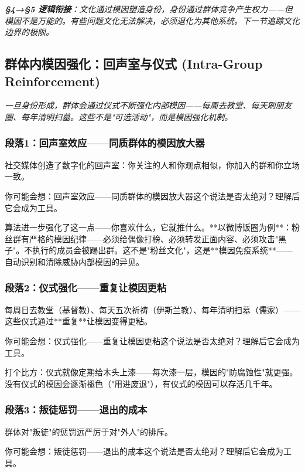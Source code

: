 \documentclass[a4paper,12pt]{book}
\newenvironment{motivation}{\begin{tcolorbox}[colback=gray!10,colframe=gray!60,title=\textit{本章动机 (Motivation)},fonttitle=\bfseries,arc=0mm,leftrule=3mm]\small\itshape}{\end{tcolorbox}}
\begin{document}
\begin{motivation}
\begin{motivation}
\begin{motivation}
	\textbf{§4→§5 逻辑衔接}：文化通过模因塑造身份，身份通过群体竞争产生权力——但模因不是万能的。有些问题文化无法解决，必须退化为其他系统。下一节追踪文化边界的极限。

	
	\subsection{群体内模因强化：回声室与仪式 (Intra-Group Reinforcement)}
	\begin{motivation}
		一旦身份形成，群体会通过仪式不断强化内部模因——每周去教堂、每天刷朋友圈、每年清明扫墓。这些不是"可选活动"，而是模因强化机制。
	\end{motivation}

	\subsubsection*{段落1：回声室效应——同质群体的模因放大器}
	社交媒体创造了数字化的回声室：你关注的人和你观点相似，你加入的群和你立场一致。
	\begin{tcolorbox}[colback=yellow!5, title=\textit{读者行为预测}]
		你可能会想：回声室效应——同质群体的模因放大器这个说法是否太绝对？理解后它会成为工具。
	\end{tcolorbox}

算法进一步强化了这一点——你喜欢什么，它就推什么。**以微博饭圈为例**：粉丝群有严格的模因纪律——必须给偶像打榜、必须转发正面内容、必须攻击"黑子"。不执行的成员会被踢出群。这不是"粉丝文化"，这是**模因免疫系统**——自动识别和清除威胁内部模因的异见。

	\subsubsection*{段落2：仪式强化——重复让模因更粘}
	每周日去教堂（基督教）、每天五次祈祷（伊斯兰教）、每年清明扫墓（儒家）——这些仪式通过**重复**让模因变得更粘。
	\begin{tcolorbox}[colback=yellow!5, title=\textit{读者行为预测}]
		你可能会想：仪式强化——重复让模因更粘这个说法是否太绝对？理解后它会成为工具。
	\end{tcolorbox}

打个比方：仪式就像定期给木头上漆——每次漆一层，模因的"防腐蚀性"就更强。没有仪式的模因会逐渐褪色（"用进废退"），有仪式的模因可以存活几千年。

	\subsubsection*{段落3：叛徒惩罚——退出的成本}
	群体对"叛徒"的惩罚远严厉于对"外人"的排斥。
	\begin{tcolorbox}[colback=yellow!5, title=\textit{读者行为预测}]
		你可能会想：叛徒惩罚——退出的成本这个说法是否太绝对？理解后它会成为工具。
	\end{tcolorbox}


\end{motivation}
\end{motivation}
\end{motivation}
\end{document}
